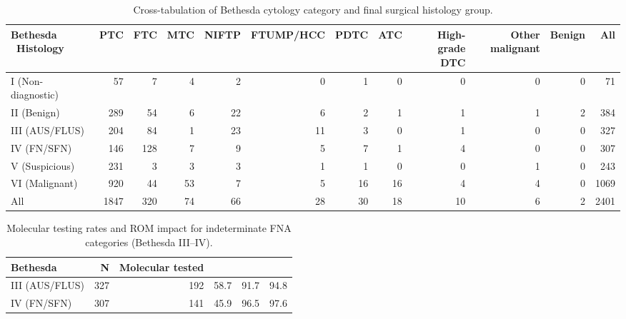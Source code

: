 \begin{table}[htbp]
\centering
\small
\caption{Cross-tabulation of Bethesda cytology category and final surgical histology group.}
\label{tab:m029_bethesda_histology}
\begin{tabular}{lrrrrrrrrrrr}
\toprule
Bethesda \ Histology & PTC & FTC & MTC & NIFTP & FTUMP/HCC & PDTC & ATC & High-grade DTC & Other malignant & Benign & All \\
\midrule
I (Non-diagnostic) & 57 & 7 & 4 & 2 & 0 & 1 & 0 & 0 & 0 & 0 & 71 \\
II (Benign) & 289 & 54 & 6 & 22 & 6 & 2 & 1 & 1 & 1 & 2 & 384 \\
III (AUS/FLUS) & 204 & 84 & 1 & 23 & 11 & 3 & 0 & 1 & 0 & 0 & 327 \\
IV (FN/SFN) & 146 & 128 & 7 & 9 & 5 & 7 & 1 & 4 & 0 & 0 & 307 \\
V (Suspicious) & 231 & 3 & 3 & 3 & 1 & 1 & 0 & 0 & 1 & 0 & 243 \\
VI (Malignant) & 920 & 44 & 53 & 7 & 5 & 16 & 16 & 4 & 4 & 0 & 1069 \\
All & 1847 & 320 & 74 & 66 & 28 & 30 & 18 & 10 & 6 & 2 & 2401 \\
\bottomrule
\end{tabular}
\end{table}

\begin{table}[htbp]
\centering
\small
\caption{Molecular testing rates and ROM impact for indeterminate FNA categories (Bethesda III--IV).}
\label{tab:m029_indet_molecular}
\begin{tabular}{lrrrrr}
\toprule
Bethesda & N & Molecular tested & \\%
\midrule
III (AUS/FLUS) & 327 & 192 & 58.7 & 91.7 & 94.8 \\
IV (FN/SFN) & 307 & 141 & 45.9 & 96.5 & 97.6 \\
\bottomrule
\end{tabular}
\end{table}